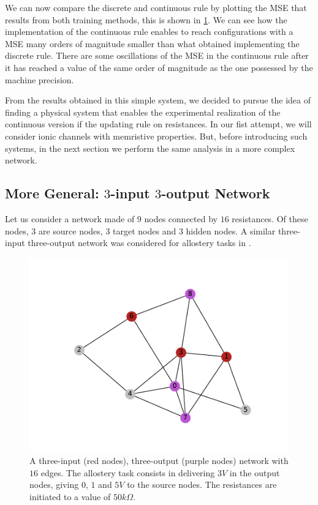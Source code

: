 \documentclass[10.5pt]{article}
\begin{document}
We can now compare the discrete and continuous rule by plotting the MSE that results from both training methods, this is shown in \cref{fig:res_disccont_simple}. We can see how the implementation of the continuous rule enables to reach configurations with a MSE many orders of magnitude smaller than what obtained implementing the discrete rule. There are some oscillations of the MSE in the continuous rule after it has reached a value of the same order of magnitude as the one possessed by the machine precision.

From the results obtained in this simple system, we decided to pursue the idea of finding a physical system that enables the experimental realization of the continuous version if the updating rule on resistances. In our fist attempt, we will consider ionic channels with memristive properties. But, before introducing such systems, in the next section we perform the same analysis in a more complex network.


\newpage
\subsection{More General: $3$-input $3$-output Network}

Let us consider a network made of $9$ nodes connected by $16$ resistances. Of these nodes, $3$ are source nodes, $3$ target nodes and $3$ hidden nodes. A similar three-input three-output network was considered for allostery tasks in \cite{Dillavou}.
\begin{figure}[h]
    \centering
    \includegraphics[width=0.5\columnwidth]{../figures_tex/general_graph.pdf}
    \caption{A three-input (red nodes), three-output (purple nodes) network with $16$ edges. The allostery task consists in delivering $3V$ in the output nodes, giving $0$, $1$ and $5V$ to the source nodes. The resistances are initiated to a value of $50k\Omega$.}
    \label{fig:res_disccont_simple}
\end{figure}
\end{document}
